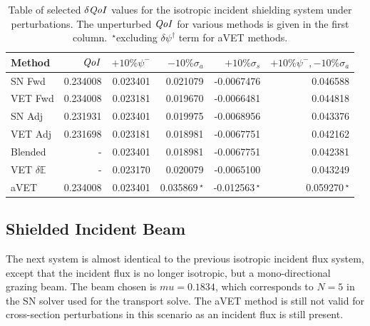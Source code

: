 \documentclass[12pt]{report}
\newcommand{\Edd}{\mathbb{E}}
\newcommand{\sigs}{\sigma_s}
\newcommand{\siga}{\sigma_a}
\newcommand{\qoi}{{\it QoI}\xspace}
\begin{document}
\begin{table}[H]
\centering
  \begin{tabular}{| l | r || r | r | r | r |}
    \hline
    Method  & $\qoi$ & $+10\% \psi^- $  & $-10\% \siga $ & $+10\% \sigs $ & $+10\% \psi^-,-10\% \siga$ \\ \hline
     SN Fwd 			&0.234008 	&0.023401 &0.021079 &-0.0067476 & 0.046588\\ \hline
     VET Fwd			&0.234008 	&0.023181 &0.019670 &-0.0066481 &0.044818\\ \hline
     SN Adj  			&0.231931 	&0.023401 &0.019975 &-0.0068956 &0.043376\\ \hline
     VET Adj 			&0.231698 	&0.023181 &0.018981 &-0.0067751 &0.042162\\ \hline
     Blended 			&-			&0.023401 &0.018981 &-0.0067751 &0.042381\\ \hline
     VET $\delta \Edd$ 	&-			&0.023170 &0.020079 &-0.0065100 &0.043249\\ \hline
     aVET			&0.234008 	&0.023401 &0.035869$\,^\star$	 &-0.012563$\,^\star$		&0.059270$\,^\star$	\\ \hline
    \end{tabular}
  \caption{Table of selected $\delta \qoi$ values for the isotropic incident shielding system under perturbations. The unperturbed $\qoi$ for various methods is given in the first column. $\,^\star$excluding $\delta \psi^\dag$ term for aVET methods.}
  \label{TableT3}
\end{table}

\subsection{Shielded Incident Beam}

The next system is almost identical to the previous isotropic incident flux system, except that the incident flux is no longer isotropic, but a mono-directional grazing beam. The beam chosen is $mu=0.1834$, which corresponds to $N=5$ in the SN solver used for the transport solve. The aVET method is still not valid for cross-section perturbations in this scenario as an incident flux is still present.
\end{document}
